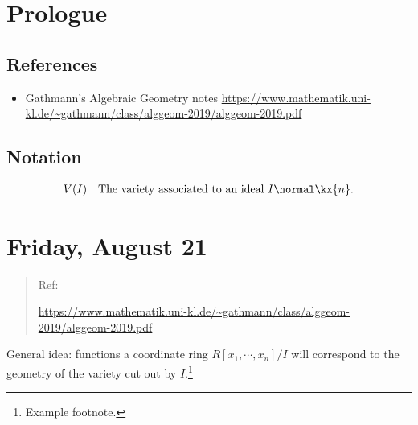 \newpage
\tableofcontents

\hypertarget{prologue}{%
\section*{Prologue}\label{prologue}}

\hypertarget{references}{%
\subsection{References}\label{references}}

\begin{itemize}
\tightlist
\item
  Gathmann's Algebraic Geometry notes\autocite{AndreasGathmann515}
  \url{https://www.mathematik.uni-kl.de/~gathmann/class/alggeom-2019/alggeom-2019.pdf}
\end{itemize}

\hypertarget{notation}{%
\subsection{Notation}\label{notation}}

\begin{align*}  
V(I) && \text{The variety associated to an ideal } I \normal \kx{n}
.\end{align*}

\newpage

\hypertarget{friday-august-21}{%
\section{Friday, August 21}\label{friday-august-21}}

\begin{quote}
Ref:

\url{https://www.mathematik.uni-kl.de/~gathmann/class/alggeom-2019/alggeom-2019.pdf}
\end{quote}

General idea: functions a coordinate ring \(R[x_1, \cdots, x_n]/I\) will
correspond to the geometry of the variety cut out by \(I\).\footnote{Example
  footnote.}

